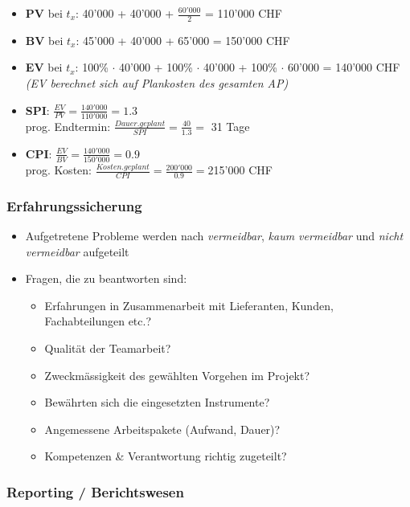 \documentclass[a4paper]{article}
\begin{document}
		\begin{itemize}[itemsep=.5em]
			\item \textbf{PV} bei $t_x$: 40'000 + 40'000 + $\frac{60'000}{2}$ = 110'000 CHF
			\item \textbf{BV} bei $t_x$: 45'000 + 40'000 + 65'000 = 150'000 CHF
			\item \textbf{EV} bei $t_x$: 100\% $\cdot$ 40'000 + 100\% $\cdot$ 40'000 + 100\% $\cdot$ 60'000 = 140'000 CHF\\
				\textit{(EV berechnet sich auf Plankosten des gesamten AP)}
			\item \textbf{SPI}: $\frac{EV}{PV} = \frac{140'000}{110'000} = 1.3$\\
			prog. Endtermin: $\frac{Dauer.geplant}{SPI} = \frac{40}{1.3} =$ 31 Tage
			\item \textbf{CPI}: $\frac{EV}{BV} = \frac{140'000}{150'000} = 0.9$\\
			prog. Kosten: $\frac{Kosten.geplant}{CPI} = \frac{200'000}{0.9} = $215'000 CHF
		\end{itemize}
	
		\subsubsection{Erfahrungssicherung}
		
		\begin{itemize}
			\item Aufgetretene Probleme werden nach \textit{vermeidbar}, \textit{kaum vermeidbar} und \textit{nicht vermeidbar} aufgeteilt
			\item Fragen, die zu beantworten sind:
				\begin{itemize}
					\item Erfahrungen in Zusammenarbeit mit Lieferanten, Kunden, Fachabteilungen etc.?
					\item Qualität der Teamarbeit?
					\item Zweckmässigkeit des gewählten Vorgehen im Projekt?
					\item Bewährten sich die eingesetzten Instrumente?
					\item Angemessene Arbeitspakete (Aufwand, Dauer)?
					\item Kompetenzen \& Verantwortung richtig zugeteilt?
				\end{itemize}
		\end{itemize}
			
		\subsubsection{Reporting / Berichtswesen}
		
\end{document}
